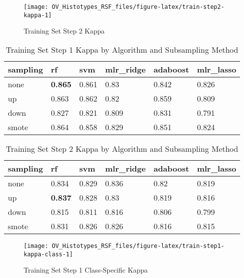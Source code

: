 \documentclass[
]{report}
\begin{document}
\begin{figure}[H]

{\centering \texttt{[image: OV\_Histotypes\_RSF\_files/figure-latex/train-step2-kappa-1]} 

}

\caption{Training Set Step 2 Kappa}\label{fig:train-step2-kappa}
\end{figure}

\begin{table}

\caption{\label{tab:train-step1-kappa-table}Training Set Step 1 Kappa by Algorithm and Subsampling Method}
\centering
\begin{tabular}[t]{l|l|l|l|l|l}
\hline
sampling & rf & svm & mlr\_ridge & adaboost & mlr\_lasso\\
\hline
none & \textbf{0.865} & 0.861 & 0.83 & 0.842 & 0.826\\
\hline
up & 0.863 & 0.862 & 0.82 & 0.859 & 0.809\\
\hline
down & 0.827 & 0.821 & 0.809 & 0.831 & 0.791\\
\hline
smote & 0.864 & 0.858 & 0.829 & 0.851 & 0.824\\
\hline
\end{tabular}
\end{table}

\begin{table}

\caption{\label{tab:train-step2-kappa-table}Training Set Step 2 Kappa by Algorithm and Subsampling Method}
\centering
\begin{tabular}[t]{l|l|l|l|l|l}
\hline
sampling & rf & svm & mlr\_ridge & adaboost & mlr\_lasso\\
\hline
none & 0.834 & 0.829 & 0.836 & 0.82 & 0.819\\
\hline
up & \textbf{0.837} & 0.828 & 0.83 & 0.819 & 0.816\\
\hline
down & 0.815 & 0.811 & 0.816 & 0.806 & 0.799\\
\hline
smote & 0.831 & 0.826 & 0.826 & 0.816 & 0.815\\
\hline
\end{tabular}
\end{table}

\begin{figure}[H]

{\centering \texttt{[image: OV\_Histotypes\_RSF\_files/figure-latex/train-step1-kappa-class-1]} 

}

\caption{Training Set Step 1 Class-Specific Kappa}\label{fig:train-step1-kappa-class}
\end{figure}
\end{document}
